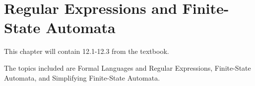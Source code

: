 \documentclass[../discrete.tex]{subfiles}
\begin{document}
\chapter{Regular Expressions and Finite-State Automata}
This chapter will contain 12.1-12.3 from the textbook.

The topics included are Formal Languages and Regular Expressions, Finite-State Automata, and Simplifying Finite-State Automata.
\end{document}
